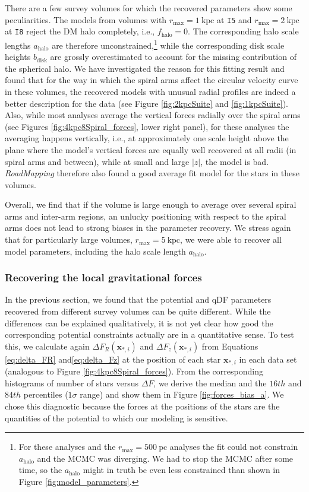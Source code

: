 \documentclass[iop,revtex4,numberedappendix,appendixfloats]{emulateapj}
\newcommand{\vect}[1]{\boldsymbol{#1}}
\newcommand{\RM}{{\sl RoadMapping}}
\begin{document}
There are a few survey volumes for which the recovered parameters show some peculiarities. The models from volumes with $r_\text{max}=1~\text{kpc}$ at \texttt{I5} and $r_\text{max}=2~\text{kpc}$ at \texttt{I8} reject the DM halo completely, i.e., $f_\text{halo}=0$. The corresponding halo scale lengths $a_\text{halo}$ are therefore unconstrained,\footnote{For these analyses and the $r_\text{max}=500~\text{pc}$ analyses the fit could not constrain $a_\text{halo}$ and the MCMC was diverging. We had to stop the MCMC after some time, so the $a_\text{halo}$ might in truth be even less constrained than shown in Figure \ref{fig:model_parameters}.} while the corresponding disk scale heights $b_\text{disk}$ are grossly overestimated to account for the missing contribution of the spherical halo. We have investigated the reason for this fitting result and found that for the way in which the spiral arms affect the circular velocity curve in these volumes, the recovered models with unusual radial profiles are indeed a better description for the data (see Figure \ref{fig:2kpcSuite} and \ref{fig:1kpcSuite}). Also, while most analyses average the vertical forces radially over the spiral arms (see Figures \ref{fig:4kpc8Spiral_forces}, lower right panel), for these analyses the averaging happens vertically, i.e., at approximately one scale height above the plane where the model's vertical forces are equally well recovered at all radii (in spiral arms and between), while at small and large $|z|$, the model is bad. \RM{} therefore also found a good average fit model for the stars in these volumes. 

Overall, we find that if the volume is large enough to average over several spiral arms and inter-arm regions, an unlucky positioning with respect to the spiral arms does not lead to strong biases in the parameter recovery. We stress again that for particularly large volumes, $r_\text{max}=5~\text{kpc}$, we were able to recover all model parameters, including the halo scale length $a_\text{halo}$.

\subsubsection{Recovering the local gravitational forces} \label{sec:local_grav_forces}

In the previous section, we found that the potential and qDF parameters recovered from different survey volumes can be quite different. While the differences can be explained qualitatively, it is not yet clear how good the corresponding potential constraints actually are in a quantitative sense. To test this, we calculate again $\Delta F_R(\vect{x}_{*,i})$ and $\Delta F_z(\vect{x}_{*,i})$ from Equations \eqref{eq:delta_FR} and\eqref{eq:delta_Fz} at the position of each star $\vect{x}_{*,i}$ in each data set (analogous to Figure \ref{fig:4kpc8Spiral_forces}). From the corresponding histograms of number of stars versus $\Delta F$, we derive the median and the $16th$ and $84th$ percentiles ($1\sigma$ range) and show them in Figure \ref{fig:forces_bias_a}. We chose this diagnostic because the forces at the positions of the stars are the quantities of the potential to which our modeling is sensitive.
\end{document}
